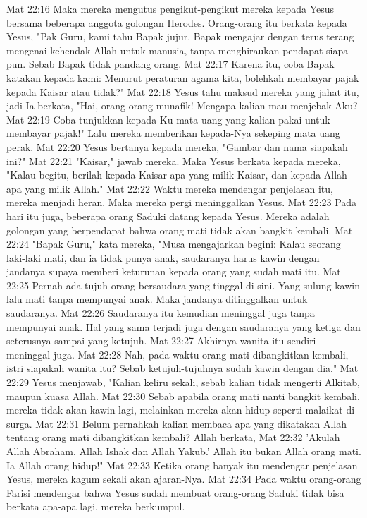 Mat 22:16  Maka mereka mengutus pengikut-pengikut mereka kepada Yesus bersama beberapa anggota golongan Herodes. Orang-orang itu berkata kepada Yesus, "Pak Guru, kami tahu Bapak jujur. Bapak mengajar dengan terus terang mengenai kehendak Allah untuk manusia, tanpa menghiraukan pendapat siapa pun. Sebab Bapak tidak pandang orang.
Mat 22:17  Karena itu, coba Bapak katakan kepada kami: Menurut peraturan agama kita, bolehkah membayar pajak kepada Kaisar atau tidak?"
Mat 22:18  Yesus tahu maksud mereka yang jahat itu, jadi Ia berkata, "Hai, orang-orang munafik! Mengapa kalian mau menjebak Aku?
Mat 22:19  Coba tunjukkan kepada-Ku mata uang yang kalian pakai untuk membayar pajak!" Lalu mereka memberikan kepada-Nya sekeping mata uang perak.
Mat 22:20  Yesus bertanya kepada mereka, "Gambar dan nama siapakah ini?"
Mat 22:21  "Kaisar," jawab mereka. Maka Yesus berkata kepada mereka, "Kalau begitu, berilah kepada Kaisar apa yang milik Kaisar, dan kepada Allah apa yang milik Allah."
Mat 22:22  Waktu mereka mendengar penjelasan itu, mereka menjadi heran. Maka mereka pergi meninggalkan Yesus.
Mat 22:23  Pada hari itu juga, beberapa orang Saduki datang kepada Yesus. Mereka adalah golongan yang berpendapat bahwa orang mati tidak akan bangkit kembali.
Mat 22:24  "Bapak Guru," kata mereka, "Musa mengajarkan begini: Kalau seorang laki-laki mati, dan ia tidak punya anak, saudaranya harus kawin dengan jandanya supaya memberi keturunan kepada orang yang sudah mati itu.
Mat 22:25  Pernah ada tujuh orang bersaudara yang tinggal di sini. Yang sulung kawin lalu mati tanpa mempunyai anak. Maka jandanya ditinggalkan untuk saudaranya.
Mat 22:26  Saudaranya itu kemudian meninggal juga tanpa mempunyai anak. Hal yang sama terjadi juga dengan saudaranya yang ketiga dan seterusnya sampai yang ketujuh.
Mat 22:27  Akhirnya wanita itu sendiri meninggal juga.
Mat 22:28  Nah, pada waktu orang mati dibangkitkan kembali, istri siapakah wanita itu? Sebab ketujuh-tujuhnya sudah kawin dengan dia."
Mat 22:29  Yesus menjawab, "Kalian keliru sekali, sebab kalian tidak mengerti Alkitab, maupun kuasa Allah.
Mat 22:30  Sebab apabila orang mati nanti bangkit kembali, mereka tidak akan kawin lagi, melainkan mereka akan hidup seperti malaikat di surga.
Mat 22:31  Belum pernahkah kalian membaca apa yang dikatakan Allah tentang orang mati dibangkitkan kembali? Allah berkata,
Mat 22:32  'Akulah Allah Abraham, Allah Ishak dan Allah Yakub.' Allah itu bukan Allah orang mati. Ia Allah orang hidup!"
Mat 22:33  Ketika orang banyak itu mendengar penjelasan Yesus, mereka kagum sekali akan ajaran-Nya.
Mat 22:34  Pada waktu orang-orang Farisi mendengar bahwa Yesus sudah membuat orang-orang Saduki tidak bisa berkata apa-apa lagi, mereka berkumpul.
